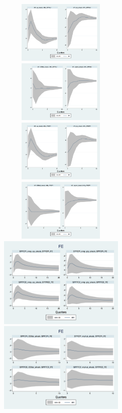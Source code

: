 \documentclass[]{article}
\begin{document}
\begin{figure}[ht]
	\centering
	\includegraphics[width=6cm,height=3cm]{figures/CPIAU_ashocks_nmp_post2007.png}  
	\includegraphics[width=6cm,height=3cm]{figures/CPIAU_ashocks_post2007.png} \\
	\includegraphics[width=6cm,height=3cm]{figures/PCEPI_ashocks_nmp_post2007.png} 
	\includegraphics[width=6cm,height=3cm]{figures/PCEPI_ashocks_post2007.png}  \\
	\smallskip
	\includegraphics[width=6cm]{figures/SPFFE_ashocks_nmp_post2007.png} 
	\includegraphics[width=6cm]{figures/SPFFE_ashocks_post2007.png} \\

\end{figure}
\end{document}

